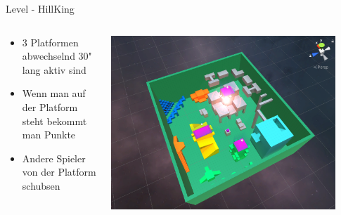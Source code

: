 \documentclass[xcolor=dvipsnames]{beamer}
\begin{document}
\begin{frame}{Level - HillKing}
\begin{columns}
\begin{column}{0.5\textwidth}
	\begin{itemize}
		\item 3 Platformen abwechselnd 30" lang aktiv sind
		\item Wenn man auf der Platform steht bekommt man Punkte
		\item Andere Spieler von der Platform schubsen 
	\end{itemize}
\end{column}
\begin{column}{0.5\textwidth} 
	\begin{center}
		\includegraphics[width=0.9\textwidth]{level_hillking.png}
	\end{center}
\end{column}
\end{columns}

\end{frame}
\end{document}
